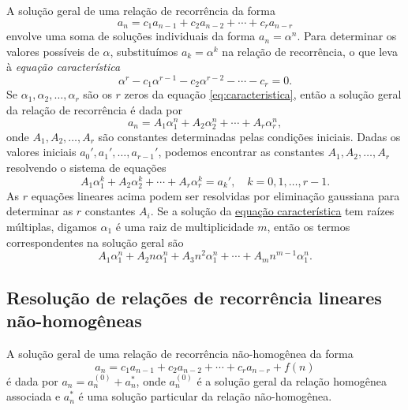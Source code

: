 \documentclass{article}
\begin{document}
\begin{prop}
    A solução geral de uma relação de recorrência da forma 
    \begin{equation}
        a_n = c_1 a_{n-1} + c_2 a_{n-2} + \cdots + c_r a_{n-r}
    \end{equation}
    \noindent envolve uma soma de soluções individuais da forma \(a_n=\alpha^n\). Para determinar os valores possíveis de \(\alpha\), substituímos \(a_k=\alpha^k\) na relação de recorrência, o que leva à \emph{equação característica}
    \begin{equation}\label{eq:caracteristica}
        \alpha^r - c_1 \alpha^{r-1} - c_2 \alpha^{r-2} - \cdots - c_r = 0.
    \end{equation}
    Se \(\alpha_1, \alpha_2, \ldots, \alpha_r\) são os \(r\) zeros da equação \eqref{eq:caracteristica}, então a solução geral da relação de recorrência é dada por
    \begin{equation}
        a_n = A_1 \alpha_1^n + A_2 \alpha_2^n + \cdots + A_r \alpha_r^n,
    \end{equation}
    \noindent onde \(A_1, A_2, \ldots, A_r\) são constantes determinadas pelas condições iniciais. Dadas os valores iniciais \(a_0', a_1', \ldots, a_{r-1}'\), podemos encontrar as constantes \(A_1, A_2, \ldots, A_r\) resolvendo o sistema de equações
    \begin{equation}
        A_1\alpha_1^k + A_2\alpha_2^k + \cdots + A_r\alpha_r^k = a_k', \quad k=0,1,\ldots,r-1.
    \end{equation}
    As \(r\) equações lineares acima podem ser resolvidas por eliminação gaussiana para determinar as \(r\) constantes \(A_i\). Se a solução da \href{eq:caracteristica}{equação característica} tem raízes múltiplas, digamos \(\alpha_1\) é uma raiz de multiplicidade \(m\), então os termos correspondentes na solução geral são
    \begin{equation}
        A_1 \alpha_1^n + A_2 n \alpha_1^n + A_3 n^2 \alpha_1^n + \cdots + A_m n^{m-1} \alpha_1^n.
    \end{equation}
\end{prop}

\subsection{Resolução de relações de recorrência lineares não-homogêneas}

\begin{prop}
    A solução geral de uma relação de recorrência não-homogênea da forma
    \begin{equation}\label{eq:nao-homogenea}
        a_n = c_1 a_{n-1} + c_2 a_{n-2} + \cdots + c_r a_{n-r} + f(n)
    \end{equation}
    \noindent é dada por \(a_n = a_n^{(0)} + a^{*}_{n}\), onde \(a_n^{(0)}\) é a solução geral da relação homogênea associada e \(a^{*}_{n}\) é uma solução particular da relação não-homogênea.
\end{prop}
\end{document}
